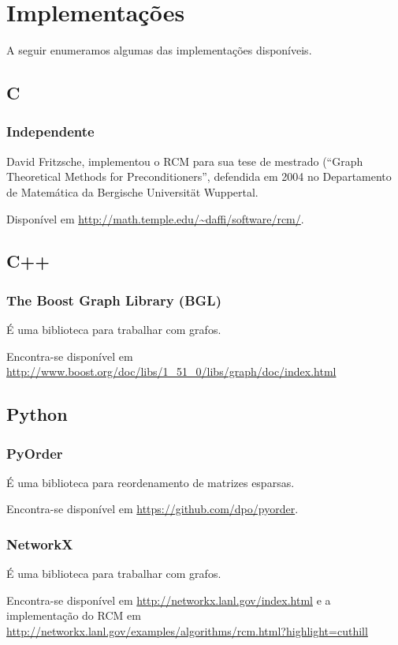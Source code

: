 % 
% 
% 

\section{Implementações}
A seguir enumeramos algumas das implementações disponíveis.

\subsection{C}
\subsubsection{Independente}
David Fritzsche, implementou o RCM para sua tese de mestrado (``Graph
Theoretical Methods for Preconditioners'', defendida em 2004 no
Departamento de Matemática da Bergische Universität Wuppertal. 

Disponível em \url{http://math.temple.edu/~daffi/software/rcm/}.

\subsection{C++}
\subsubsection{The Boost Graph Library (BGL)}
É uma biblioteca para trabalhar com grafos.

Encontra-se disponível em
\url{http://www.boost.org/doc/libs/1_51_0/libs/graph/doc/index.html}

\subsection{Python}
\subsubsection{PyOrder}
É uma biblioteca para reordenamento de matrizes esparsas.

Encontra-se disponível em \url{https://github.com/dpo/pyorder}.

\subsubsection{NetworkX}
É uma biblioteca para trabalhar com grafos.

Encontra-se disponível em \url{http://networkx.lanl.gov/index.html} e a
implementação do RCM em
\url{http://networkx.lanl.gov/examples/algorithms/rcm.html?highlight=cuthill}
